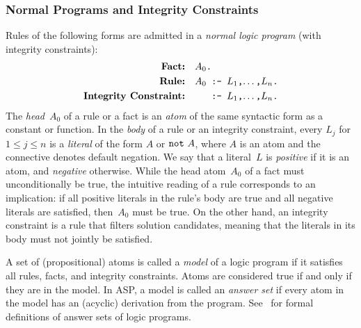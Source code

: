 \subsubsection{Normal Programs and Integrity Constraints}\label{subsec:gringo:normal}
Rules of the following forms are admitted in a
\emph{normal logic program} (with integrity constraints):
\begin{align*}
\textbf{Fact:} & \quad \texttt{$A_0$.} \\
\textbf{Rule:} & \quad \texttt{$A_0$ :- $L_1$,$\dots$,$L_n$.} \\
\textbf{Integrity Constraint:} & \quad \texttt{\phantom{$A_0$} :- $L_1$,$\dots$,$L_n$.}
\end{align*}
%
%
%
%
The \emph{head}~$A_0$ of a rule or a fact is an \emph{atom} of the same
syntactic form as a constant or function.
%
%
In the \emph{body} of a rule or an integrity constraint,
every $L_j$ for $1\leq j\leq n$ is a \emph{literal} of the form $A$ or $\texttt{not}~A$,
where $A$ is an atom and
the connective  denotes default negation.
%
%
%
%
We say that a literal~$L$ is \emph{positive} if it is an atom,
and \emph{negative} otherwise.
While the head atom~$A_0$ of a fact must unconditionally be true,
the intuitive reading of a rule corresponds to an implication:
if all positive literals in the rule's body are true and all negative
literals are satisfied, then~$A_0$ must be true.
On the other hand, an integrity constraint is a rule that filters solution candidates,
meaning that the literals in its body must not jointly be satisfied.

A set of (propositional) atoms is called a \emph{model} of a logic program if it satisfies all rules, facts, and integrity constraints.
Atoms are considered true if and only if they are in the model.
In ASP, a model is called an \emph{answer set} if every atom in the model has an (acyclic) derivation from the program.
%
See~\cite{gellif88b,gelfond08a,lifschitz08a} for formal definitions of answer sets of logic programs.

